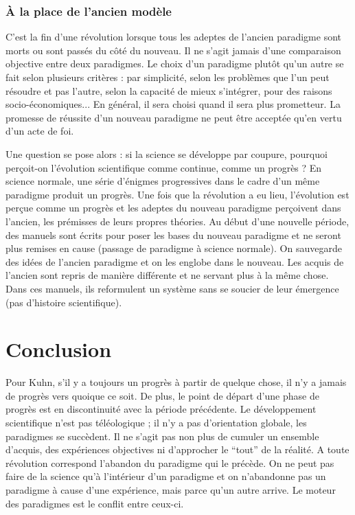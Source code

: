 \documentclass[11pt,a4paper]{article} %
\begin{document}
\subsubsection{À la place de l'ancien modèle}
C'est la fin d'une révolution lorsque tous les adeptes de l'ancien paradigme sont morts ou sont passés du côté du nouveau.
Il ne s'agit jamais d'une comparaison objective entre deux paradigmes.
Le choix d'un paradigme plutôt qu'un autre se fait selon plusieurs critères : par simplicité, selon les problèmes que l'un peut résoudre et pas l'autre, selon la capacité de mieux s'intégrer, pour des raisons socio-économiques...
En général, il sera choisi  quand il sera plus prometteur.
La promesse de réussite d'un nouveau paradigme ne peut être acceptée qu'en vertu d'un acte de foi.

Une question se pose alors : si la science se développe par coupure, pourquoi perçoit-on l'évolution scientifique comme continue, comme un progrès ?  En science normale, une série d'énigmes progressives dans le cadre d'un même paradigme produit un progrès.
Une fois que la révolution a eu lieu, l'évolution est perçue comme un progrès et les adeptes du nouveau paradigme perçoivent dans l'ancien, les prémisses de leurs propres théories.
Au début d'une nouvelle période, des manuels sont écrits pour poser les bases du nouveau paradigme et ne seront plus remises en cause (passage de paradigme à science normale).
On sauvegarde des idées de l'ancien paradigme et on les englobe dans le nouveau.
Les acquis de l'ancien sont repris de manière différente et ne servant plus à la même chose.
Dans ces manuels, ils reformulent un système sans se soucier de leur émergence (pas d'histoire scientifique).

\section{Conclusion}
Pour Kuhn, s'il y a toujours un progrès à partir de quelque chose, il n'y a jamais de progrès vers quoique ce soit.
De plus, le point de départ d'une phase de progrès est en discontinuité avec la période précédente.
Le développement scientifique n'est pas téléologique ; il n'y a pas d'orientation globale, les paradigmes se succèdent.
Il ne s'agit pas non plus de cumuler un ensemble d'acquis, des expériences objectives ni d'approcher le ``tout'' de la réalité.
A toute révolution correspond l'abandon du paradigme qui le précède.
On ne peut pas faire de la science qu'à l'intérieur d'un paradigme et on n'abandonne pas un paradigme à cause d'une expérience, mais parce qu'un autre arrive.
Le moteur des paradigmes est le conflit entre ceux-ci.
\end{document}
